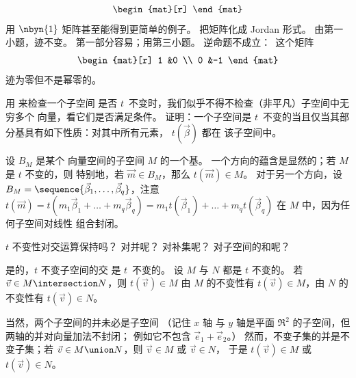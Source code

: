 \begin{exercises}
\begin{answer}
\begin{exparts}
\begin{equation*}
\begin{mat}[r]
               \end{mat}
            \end{equation*}
            用 $\nbyn{1}$ 矩阵甚至能得到更简单的例子。
         \partsitem 把矩阵化成 Jordan 形式。
            由第一小题，迹不变。
         \partsitem 第一部分容易；用第三小题。
            逆命题不成立：~这个矩阵
            \begin{equation*}
               \begin{mat}[r]
                  1  &0  \\
                  0  &-1
               \end{mat}
            \end{equation*}
            迹为零但不是幂零的。
       \end{exparts}  
     \end{answer}
  \item 
    用  来检查一个子空间
    是否 $t$~不变时，我们似乎不得不检查（非平凡）子空间中无穷多个
    向量，看它们是否满足条件。
    证明：一个子空间是 \( t \)~不变的当且仅当其部分基具有如下性质：对其中所有元素，
    $t(\vec{\beta})$ 都在
    该子空间中。
    \begin{answer}
      设 \( B_M \) 是某个
      向量空间的子空间 \( M \) 的一个基。
      一个方向的蕴含是显然的；若 \( M \) 是 \( t \) 不变的，则
      特别地，若 \( \vec{m}\in B_M \)，那么 \( t(\vec{m})\in M \)。
      对于另一个方向，设
      \( B_M=\sequence{\vec{\beta}_1,\dots,\vec{\beta}_q} \)，注意
      \( t(\vec{m})=t(m_1\vec{\beta}_1+\dots+m_q\vec{\beta}_q)
                   =m_1t(\vec{\beta}_1)+\dots+m_qt(\vec{\beta}_q) \)
      在 \( M \) 中，因为任何子空间对线性
      组合封闭。 
    \end{answer}
  \recommended \item 
    \( t \) 不变性对交运算保持吗？
    对并呢？
    对补集呢？
    对子空间的和呢？
    \begin{answer}
      是的，$t$ 不变子空间的交
      是 $t$~不变的。
      设 \( M \) 与 \( N \) 都是 \( t \) 不变的。
      若 \( \vec{v}\in M\intersection N \)，则 \( t(\vec{v})\in M \) 
      由 \( M \) 的不变性有 \( t(\vec{v})\in M \)，由
      \( N \) 的不变性有 \( t(\vec{v})\in N \)。

      当然，两个子空间的并未必是子空间
      （记住 $x$ 轴\hbox{} 与 $y$ 轴是平面
      $\Re^2$ 的子空间，但两轴的并对向量加法不封闭；
      例如它不包含
      $\vec{e}_1+\vec{e}_2$。）
      然而，不变子集的并是不变子集；若
      \( \vec{v}\in M\union N \)，则 \( \vec{v}\in M \) 或 \( \vec{v}\in N \)，
      于是 \( t(\vec{v})\in M \) 或 \( t(\vec{v})\in N \)。


\end{answer}
\end{exercises}
